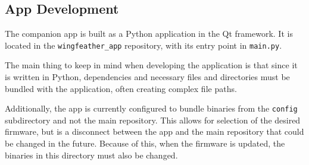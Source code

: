 \documentclass[12pt, titlepage]{article}
\begin{document}
\subsection{App Development}

The companion app is built as a Python application in the Qt framework. It is located in the \texttt{wingfeather\_app} repository, with its entry point in \texttt{main.py}. 

The main thing to keep in mind when developing the application is that since it is written in Python, dependencies and necessary files and directories must be bundled with the application, often creating complex file paths.

Additionally, the app is currently configured to bundle binaries from the \texttt{config} subdirectory and not the main repository. This allows for selection of the desired firmware, but is a disconnect between the app and the main repository that could be changed in the future. Because of this, when the firmware is updated, the binaries in this directory must also be changed.
\end{document}
